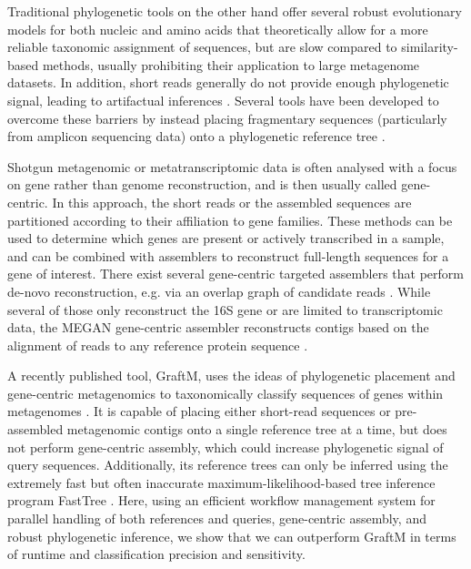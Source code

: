 \documentclass{bioinfo}
\begin{document}
Traditional phylogenetic tools on the other hand offer several robust evolutionary models for both nucleic and amino acids that theoretically allow for a more reliable taxonomic assignment of sequences, but are slow compared to similarity-based methods, usually prohibiting their application to large metagenome datasets. In addition, short reads generally do not provide enough phylogenetic signal, leading to artifactual inferences \citep{Matsen2010}. Several tools have been developed to overcome these barriers by instead placing fragmentary sequences (particularly from amplicon sequencing data) onto a phylogenetic reference tree \citep{Matsen2010,Berger2011b,Barbera2019}.

Shotgun metagenomic or metatranscriptomic data is often analysed with a focus on gene rather than genome reconstruction, and is then usually called gene-centric. In this approach, the short reads or the assembled sequences are partitioned according to their affiliation to gene families. These methods can be used to determine which genes are present or actively transcribed in a sample, and can be combined with assemblers to reconstruct full-length sequences for a gene of interest. There exist several gene-centric targeted assemblers that perform de-novo reconstruction, e.g. via an overlap graph of candidate reads \citep{Kucuk2017,Pericard2017,Steinegger2018,Gruber-Vodicka2019}. While several of those only reconstruct the 16S gene or are limited to transcriptomic data, the MEGAN gene-centric assembler reconstructs contigs based on the alignment of reads to any reference protein sequence \citep{Huson2017}.

A recently published tool, GraftM, uses the ideas of phylogenetic placement and gene-centric metagenomics to taxonomically classify sequences of genes within metagenomes \citep{Boyd2018}. It is capable of placing either short-read sequences or pre-assembled metagenomic contigs onto a single reference tree at a time, but does not perform gene-centric assembly, which could increase phylogenetic signal of query sequences. Additionally, its reference trees can only be inferred using the extremely fast but often inaccurate maximum-likelihood-based tree inference program FastTree \citep{Price2010,Zhou2018}. Here, using an efficient workflow management system for parallel handling of both references and queries, gene-centric assembly, and robust phylogenetic inference, we show that we can outperform GraftM in terms of runtime and classification precision and sensitivity. 
\end{document}
